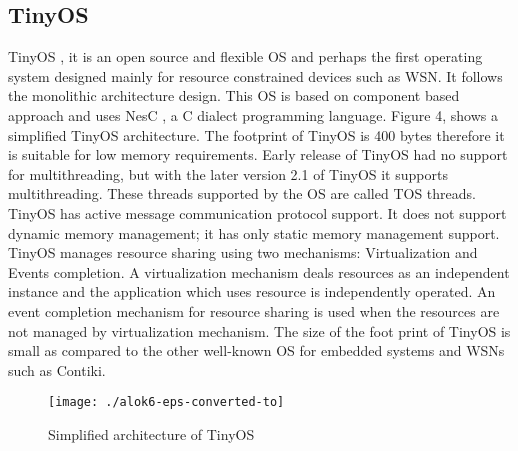 \documentclass[12pt,journal,communications surveys and tutorials]{IEEEtran}
\begin{document}
\subsection{TinyOS}
TinyOS \cite{levis2005tinyos}, it is an open source and flexible OS and perhaps the first operating system designed mainly for resource constrained devices such as WSN. It follows the monolithic architecture design. This OS is based on component based approach and uses NesC , a C dialect programming language. Figure 4, shows a simplified TinyOS architecture. The footprint of TinyOS is 400 bytes therefore it is suitable for low memory requirements. Early release of TinyOS had no support for multithreading, but with the later version 2.1 of TinyOS it supports multithreading.  These threads supported by the OS are called TOS threads. TinyOS has active message communication protocol support. It does not support dynamic memory management; it has only static memory management support. TinyOS manages resource sharing using two mechanisms: Virtualization and Events completion. A virtualization mechanism deals resources as an independent instance and the application which uses resource is independently operated. An event completion mechanism for resource sharing is used when the resources are not managed by virtualization mechanism. The size of the foot print of TinyOS is small as compared to the other well-known OS for embedded systems and WSNs such as Contiki.\nocite{levis2012experiences}
\begin{figure}[t]
\centering
\texttt{[image: ./alok6-eps-converted-to]}
\caption{Simplified architecture of TinyOS}
\label{fig:alok6-eps-converted-to}
\end{figure}
\end{document}
